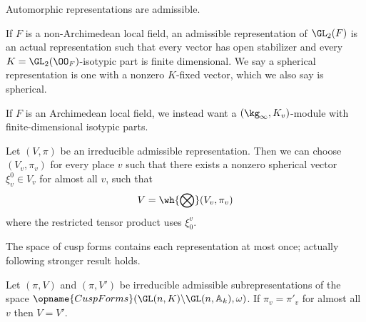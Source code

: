 \begin{proposition}
  Automorphic representations are admissible.
\end{proposition}

\begin{definition}
  If $F$ is a non-Archimedean local field,
  an admissible representation of $\GL_2(F)$
  is an actual representation such that every vector has open stabilizer
  and every $K = \GL_2(\OO_F)$-isotypic part is finite dimensional.
  We say a spherical representation is one with a nonzero $K$-fixed vector,
  which we also say is spherical.

  If $F$ is an Archimedean local field,
  we instead want a $(\kg_\infty, K_v)$-module
  with finite-dimensional isotypic parts.
\end{definition}

\begin{theorem}
  Let $(V, \pi)$ be an irreducible admissible representation.
  Then we can choose $(V_v, \pi_v)$ for every place $v$ such that
  there exists a nonzero spherical vector $\xi^0_v \in V_v$ for almost all $v$,
  such that \[ V = \wh{\bigotimes} (V_v, \pi_v) \]
  where the restricted tensor product uses $\xi_0^v$.
\end{theorem}


The space of cusp forms contains each representation at most once;
actually following stronger result holds.
\begin{theorem}
  Let $(\pi, V)$ and $(\pi, V')$ be irreducible admissible subrepresentations
  of the space $\opname{CuspForms}(\GL(n, K) \backslash \GL(n, \AA_k), \omega)$.
  If $\pi_v = \pi'_v$ for almost all $v$ then $V = V'$.
\end{theorem}
